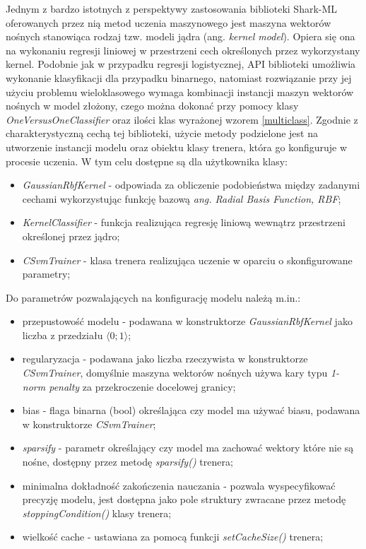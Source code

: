 Jednym z bardzo istotnych z perspektywy zastosowania biblioteki Shark-ML oferowanych przez nią metod uczenia maszynowego jest maszyna wektorów nośnych stanowiąca rodzaj tzw. modeli jądra (ang. \textit{kernel model}). Opiera się ona na wykonaniu regresji liniowej w przestrzeni cech określonych przez wykorzystany kernel. Podobnie jak w przypadku regresji logistycznej, API biblioteki umożliwia wykonanie klasyfikacji dla przypadku binarnego, natomiast rozwiązanie przy jej użyciu problemu wieloklasowego wymaga kombinacji instancji maszyn wektorów nośnych w model złożony, czego można dokonać przy pomocy klasy \textit{OneVersusOneClassifier} oraz ilości klas wyrażonej wzorem \ref{multiclass}. Zgodnie z charakterystyczną cechą tej biblioteki, użycie metody podzielone jest na utworzenie instancji modelu oraz obiektu klasy trenera, która go konfiguruje w procesie uczenia. W tym celu dostępne są dla użytkownika klasy:

\begin{itemize}
	\item \textit{GaussianRbfKernel} - odpowiada za obliczenie podobieństwa między zadanymi cechami wykorzystując funkcję bazową \textit{ang. Radial Basis Function, RBF};
	\item \textit{KernelClassifier} - funkcja realizująca regresję liniową wewnątrz przestrzeni określonej przez jądro;
	\item \textit{CSvmTrainer} - klasa trenera realizująca uczenie w oparciu o skonfigurowane parametry;
\end{itemize}

Do parametrów pozwalających na konfigurację modelu należą m.in.:

\begin{itemize}
	\item przepustowość modelu - podawana w konstruktorze \textit{GaussianRbfKernel} jako liczba z przedziału $\langle 0 ; 1 \rangle$;
	\item regularyzacja - podawana jako liczba rzeczywista w konstruktorze \textit{CSvmTrainer}, domyślnie maszyna wektorów nośnych używa kary typu \textit{1-norm penalty} za przekroczenie docelowej granicy;
	\item bias - flaga binarna (bool) określająca czy model ma używać biasu, podawana w konstruktorze \textit{CSvmTrainer};
	\item \textit{sparsify} - parametr określający czy model ma zachować wektory które nie są nośne, dostępny przez metodę \textit{sparsify()} trenera;
	\item minimalna dokładność zakończenia nauczania - pozwala wyspecyfikować precyzję modelu, jest dostępna jako pole struktury zwracane przez metodę \textit{stoppingCondition()} klasy trenera;
	\item wielkość cache - ustawiana za pomocą funkcji \textit{setCacheSize()} trenera;
\end{itemize}

